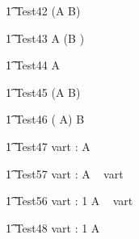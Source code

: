 \begin{circusaction}
   \t1 Test42 \circdef  (A \circseq B) \circseq {} \\
\end{circusaction}

\begin{circusaction}
   \t1 Test43 \circdef  A \circseq (B \circseq {}) \\
\end{circusaction}

\begin{circusaction}
   \t1 Test44 \circdef  {} \circseq A \\
\end{circusaction}

\begin{circusaction}
   \t1 Test45 \circdef  {} \circseq (A \circseq B) \\
\end{circusaction}

\begin{circusaction}
   \t1 Test46 \circdef  ( \circseq A) \circseq B \\
\end{circusaction}


\begin{circusaction}
  \t1 Test47 \circdef \circwait vart : \nat  \circspot A \\
\end{circusaction}

\begin{circusaction}
  \t1 Test57 \circdef \circwait vart : \nat  \circspot A \circseq \circwait~ vart \\
\end{circusaction}

\begin{circusaction}
  \t1 Test56 \circdef \circwait vart : 1  \circspot A \circseq \circwait~ vart \\
\end{circusaction}


\begin{circusaction}
  \t1 Test48 \circdef \circwait vart : 1   \circspot  A \\
\end{circusaction}

